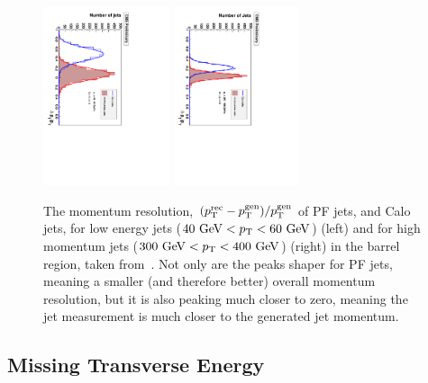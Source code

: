 \begin{figure}[htbp]
  \begin{center}
  \includegraphics[width=0.33\textwidth, angle =90]{Figures/detector/MomResPFjetCaloJet_lowPt.pdf}
  \includegraphics[width=0.33\textwidth, angle =90]{Figures/detector/MomResPFjetCaloJet_highPt.pdf}
  \caption{The momentum resolution, $(p_{\text{T}}^{\mathrm{rec}} - p_{\text{T}}^{\mathrm{gen}})/p_{\text{T}}^{\mathrm{gen}}$ of \ac{PF} jets, and Calo jets, for low energy jets ($40~\mathrm{GeV}<p_{\text{T}}<60~\mathrm{GeV}$) (left) and for high momentum jets ($300~\mathrm{GeV}<p_{\text{T}}<400~\mathrm{GeV}$) (right) in the barrel region, taken from~\cite{PFT-09-001}. Not only are the peaks shaper for \ac{PF} jets, meaning a smaller (and therefore better) overall momentum resolution, but it is also peaking much closer to zero, meaning the jet measurement is much closer to the generated jet momentum.}
  \label{fig:PFmomRes}
  \end{center}
\end{figure}


\subsection{Missing Transverse Energy}

